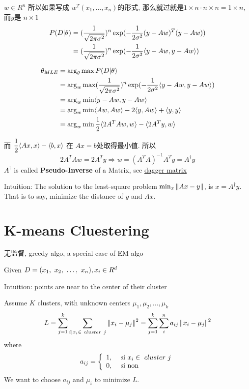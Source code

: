 \documentclass{article}
\begin{document}
$w \in R^n$
所以如果写成 $w^T (x_1, \ldots, x_n)$的形式, 
那么就过就是$1 \times n \cdot n \times n = 1 \times n$, 而$y$是 $n \times 1$
$$
\begin{aligned}
P(D|\theta) 
& = (\dfrac{1}{\sqrt{2\pi \sigma^2}})^n \exp(- \dfrac{1}{2\sigma^2} (y - Aw)^T (y - Aw)) \\
& = (\dfrac{1}{\sqrt{2\pi \sigma^2}})^n \exp(- \dfrac{1}{2\sigma^2} \langle y - Aw , y - Aw\rangle) \\
\end{aligned}
$$

$$
\begin{aligned}
\theta_{MLE} 
& = \arg_\theta \max P(D|\theta) \\
& = \arg_w \max (\dfrac{1}{\sqrt{2\pi \sigma^2}})^n \exp(- \dfrac{1}{2\sigma^2} \langle y - Aw , y - Aw\rangle) \\
& = \arg_w \min \langle y - Aw , y - Aw\rangle \\
& = \arg_w \min \langle Aw , Aw\rangle - 2\langle y , Aw\rangle + \langle y , y\rangle \\
& = \arg_w \min \dfrac{1}{2}\langle 2 A^T A w , w\rangle - \langle 2 A^T y , w\rangle \\
\end{aligned}
$$

而 $\dfrac{1}{2} \langle Ax , x\rangle - \langle b , x\rangle$ 在 $Ax = b$处取得最小值. 所以
$$ 2 A^T A w = 2 A^T y \Rightarrow w = (A^T A)^{-1} A^T y = A^{\dagger} y $$
$A^\dagger$ is called \textbf{Pseudo-Inverse} of a Matrix, 
see \href{https://inst.eecs.berkeley.edu/~ee127a/book/login/def\_pseudo\_inv.html}{dagger matrix}

Intuition: 
The solution to the least-square problem $\min_x \left\Vert Ax - y\right\Vert$, is $x = A^\dagger y$.\\
That is to say, minimize the distance of $y$ and $Ax$.

\section{K-means Cluestering}
无监督, greedy algo, a special case of EM algo

Given $D = (x_1,~x_2,~\ldots,~x_n), x_i \in R^d$

Intuition: points are near to the center of their cluster

Assume $K$ clusters, with unknown centers $\mu_1, \mu_2, \ldots, \mu_k$
$$
L
= \sum_{j = 1}^k \sum_{i | x_i \in\ cluster\ j}\left\Vert x_i - \mu_j\right\Vert^2
= \sum_{j = 1}^k \sum_i^n a_{ij}\left\Vert x_i - \mu_j\right\Vert^2
$$
where
$$
a_{ij} =
\left\{
  \begin{array}{ll}
    1, & \textrm{\ si } x_i \in\ cluster\ j\\
    0, & \textrm{ si non}
  \end{array}
\right.
$$
We want to choose $a_{ij}$ and $\mu_i$ to minimize $L$.
\end{document}
